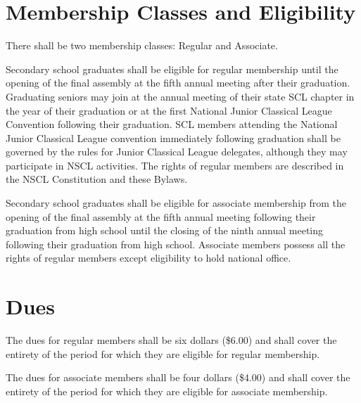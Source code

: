 \documentclass{bylaws}
\newcommand{\NSCL}{\textsc{NSCL}\xspace}
\newcommand{\SCL}{\textsc{SCL}\xspace}
\begin{document}
\begin{linenumbers}[1]


  \section{Membership Classes and Eligibility}
  There shall be two membership classes: Regular and Associate.
  \begin{enumerate}
    \sub[Regular] Secondary school graduates shall be eligible for
    regular membership until the opening of the final assembly at the
    fifth annual meeting after their graduation. Graduating seniors may
    join at the annual meeting of their state \SCL chapter in the year
    of their graduation or at the first National Junior Classical League
    Convention following their graduation. \SCL members attending the
    National Junior Classical League convention immediately following
    graduation shall be governed by the rules for Junior Classical
    League delegates, although they may participate in \NSCL
    activities. The rights of regular members are described in the \NSCL
    Constitution and these Bylaws.
    
    \sub[Associate] Secondary school graduates shall be eligible for
    associate membership from the opening of the final assembly at the
    fifth annual meeting following their graduation from high school
    until the closing of the ninth annual meeting following their
    graduation from high school. Associate members possess all the
    rights of regular members except eligibility to hold national
    office.\\
  \end{enumerate}

  \section{Dues}
  \begin{enumerate}
    \sub[Regular] The dues for regular members shall be six dollars
    (\$6.00) and shall cover the entirety of the period for which they
    are eligible for regular membership.
    
    \sub[Associate] The dues for associate members shall be four
    dollars (\$4.00) and shall cover the entirety of the period for
    which they are eligible for associate membership.\\
  \end{enumerate}


\end{linenumbers}
\end{document}

